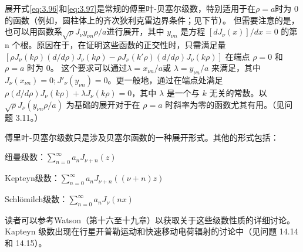 \documentclass[lang=cn,10pt,newtx,bibend=biber,device=pad]{elegantbook}
\begin{document}
展开式\ref{eq:3.96}和\ref{eq:3.97}是常规的傅里叶-贝塞尔级数，特别适用于在$\rho =a$时为 0 的函数（例如，圆柱体上的齐次狄利克雷边界条件；见下节）。
但需要注意的是，也可以用函数系$\sqrt{\rho}J_\nu y_{\nu n}\rho /a$进行展开，其中 $y_{\nu n}$ 是方程 $[dJ_\nu(x)]/dx = 0$ 的第 n 个根。原因在于，在证明这些函数的正交性时，只需满足量 $[\rho J_\nu(k\rho)(d/d\rho)J_\nu(k\rho)-\rho J_\nu(k'\rho)(d/d\rho)J_\nu(k\rho)]$ 在端点 $\rho = 0$ 和 $\rho = a$ 时为 0。
这个要求可以通过$\lambda = x_{\nu n}/a$或 $\lambda = y_{\nu n}/a$ 来满足，其中 $J_\nu(x_{\nu n}) = 0;J'_\nu (y_{\nu n})=0$。更一般地，通过在端点处满足 $\rho(d/d\rho)J_\nu(k\rho) + \lambda J_\nu(k\rho) = 0$，其中 $\lambda$ 是一个与 $k$ 无关的常数。以 $\sqrt{\rho}J_\nu (y_{\nu n}\rho/a)$ 为基础的展开对于在 $\rho = a$ 时斜率为零的函数尤其有用。（见问题 3.11。）

傅里叶-贝塞尔级数只是涉及贝塞尔函数的一种展开形式。其他的形式包括：

纽曼级数：$\sum_{n=0}^\infty a_n J_{\nu + n}(z)$

Kepteyn级数：$\sum_{n=0}^\infty a_n J_{\nu +n}((\nu + n)z)$

Schl\"{o}milch级数：$\sum_{n=0}^\infty a_n J_{\nu}(nx)$

读者可以参考Watson（第十六至十九章）以获取关于这些级数性质的详细讨论。Kapteyn 级数出现在行星开普勒运动和快速移动电荷辐射的讨论中（见问题 14.14 和 14.15）。
\end{document}
